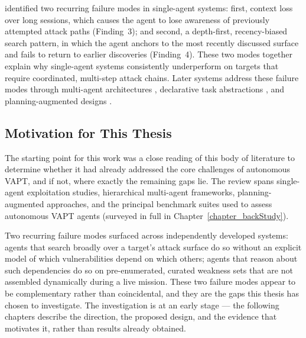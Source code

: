 \citet{deng2024pentestgpt} identified two recurring failure modes in single-agent systems: first, context loss over long sessions, which causes the agent to lose awareness of previously attempted attack paths (Finding~3); and second, a depth-first, recency-biased search pattern, in which the agent anchors to the most recently discussed surface and fails to return to earlier discoveries (Finding~4). These two modes together explain why single-agent systems consistently underperform on targets that require coordinated, multi-step attack chains. Later systems address these failure modes through multi-agent architectures \citep{kong2025vulnbot,zhu2024hptsa}, declarative task abstractions \citep{singer2025incalmo}, and planning-augmented designs \citep{wang2025checkmate}.

\subsection{Motivation for This Thesis}

The starting point for this work was a close reading of this body of literature to determine whether it had already addressed the core challenges of autonomous VAPT, and if not, where exactly the remaining gaps lie. The review spans single-agent exploitation studies, hierarchical multi-agent frameworks, planning-augmented approaches, and the principal benchmark suites used to assess autonomous VAPT agents (surveyed in full in Chapter~\ref{chapter_backStudy}).

Two recurring failure modes surfaced across independently developed systems: agents that search broadly over a target's attack surface do so without an explicit model of which vulnerabilities depend on which others; agents that reason about such dependencies do so on pre-enumerated, curated weakness sets that are not assembled dynamically during a live mission. These two failure modes appear to be complementary rather than coincidental, and they are the gaps this thesis has chosen to investigate. The investigation is at an early stage --- the following chapters describe the direction, the proposed design, and the evidence that motivates it, rather than results already obtained.
